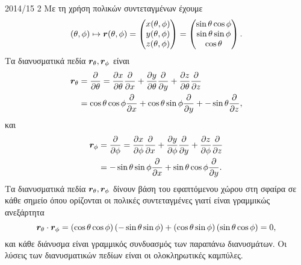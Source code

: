\documentclass[a4paper,11pt]{article}
\begin{document}
\begin{solution}{2014/15 2}
    Με τη χρήση πολικών συντεταγμένων έχουμε
    \begin{equation*}
        (\theta, \phi) \mapsto \bm{r}(\theta, \phi) =
        \begin{pmatrix}
            x(\theta, \phi)\\
            y(\theta, \phi)\\
            z(\theta, \phi)
        \end{pmatrix}=
        \begin{pmatrix}
            \sin{\theta}\cos{\phi}\\
            \sin{\theta}\sin{\phi}\\
            \cos{\theta}
        \end{pmatrix}.
    \end{equation*}
    Τα διανυσματικά πεδία \( \bm{r}_{\theta}, \bm{r}_{\phi} \) είναι
    \begin{align*}
        \bm{r}_{\theta} &= \frac{\partial}{\partial \theta} =
        \frac{\partial x}{\partial \theta}\frac{\partial}{\partial x} +
        \frac{\partial y}{\partial \theta}\frac{\partial}{\partial y} +
        \frac{\partial z}{\partial \theta}\frac{\partial}{\partial z} \\
        &=
        \cos{\theta}\cos{\phi}\frac{\partial}{\partial x} +
        \cos{\theta}\sin{\phi}\frac{\partial}{\partial y} +
        -\sin{\theta}\frac{\partial}{\partial z},
    \end{align*}
    και
    \begin{align*}
        \bm{r}_{\phi} &= \frac{\partial}{\partial \phi} =
        \frac{\partial x}{\partial \phi}\frac{\partial}{\partial x} +
        \frac{\partial y}{\partial \phi}\frac{\partial}{\partial y} +
        \frac{\partial z}{\partial \phi}\frac{\partial}{\partial z} \\
        &=
        -\sin{\theta}\sin{\phi}\frac{\partial}{\partial x} +
        \sin{\theta}\cos{\phi}\frac{\partial}{\partial y}.
    \end{align*}
    Τα διανυσματικά πεδία \( \bm{r}_{\theta}, \bm{r}_{\phi} \) δίνουν βάση
    του εφαπτόμενου χώρου στη σφαίρα σε κάθε σημείο όπου ορίζονται οι πολικές
    συντεταγμένες γιατί είναι γραμμικώς ανεξάρτητα
    \begin{equation*}
        \bm{r}_{\theta} \cdot \bm{r}_{\phi} =
        \left(\cos{\theta}\cos{\phi}\right) \left(-\sin{\theta}\sin{\phi}\right)+
        \left(\cos{\theta}\sin{\phi}\right) \left(\sin{\theta}\cos{\phi}\right)
        = 0,
    \end{equation*}
    και κάθε διάνυσμα είναι γραμμικός συνδυασμός των παραπάνω διανυσμάτων. Οι
    λύσεις των διανυσματικών πεδίων είναι οι ολοκληρωτικές καμπύλες.


\end{solution}
\end{document}
